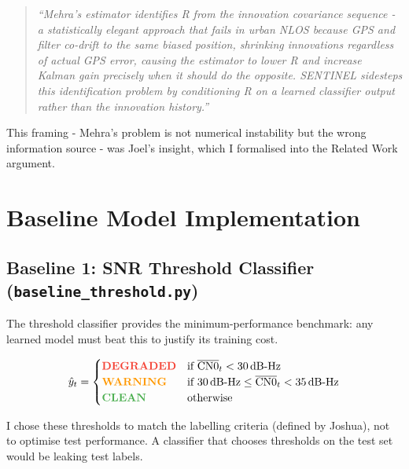 \documentclass[12pt,a4paper]{article}
\newcommand{\clean}[1]{\textcolor{cleanGreen}{\textbf{#1}}}
\newcommand{\warn}[1]{\textcolor{warnOrange}{\textbf{#1}}}
\newcommand{\degrad}[1]{\textcolor{degradRed}{\textbf{#1}}}
\begin{document}
\begin{quote}
\textit{``Mehra's estimator identifies R from the innovation covariance sequence - 
a statistically elegant approach that fails in urban NLOS because GPS and filter
co-drift to the same biased position, shrinking innovations regardless of actual GPS error,
causing the estimator to lower R and increase Kalman gain precisely when it should do
the opposite.
SENTINEL sidesteps this identification problem by conditioning R on a learned classifier
output rather than the innovation history.''}
\end{quote}

This framing - Mehra's problem is not numerical instability but the wrong information
source - was Joel's insight, which I formalised into the Related Work argument.

\section{Baseline Model Implementation}

\subsection{Baseline 1: SNR Threshold Classifier (\texttt{baseline\_threshold.py})}

The threshold classifier provides the minimum-performance benchmark:
any learned model must beat this to justify its training cost.

\begin{equation}
  \hat{y}_t = \begin{cases}
    \degrad{\text{DEGRADED}} & \text{if } \overline{\text{CN0}}_t < 30\,\text{dB-Hz} \\
    \warn{\text{WARNING}}    & \text{if } 30\,\text{dB-Hz} \leq \overline{\text{CN0}}_t < 35\,\text{dB-Hz} \\
    \clean{\text{CLEAN}}     & \text{otherwise}
  \end{cases}
\end{equation}

I chose these thresholds to match the labelling criteria (defined by Joshua), not to
optimise test performance.
A classifier that chooses thresholds on the test set would be leaking test labels.
\end{document}
